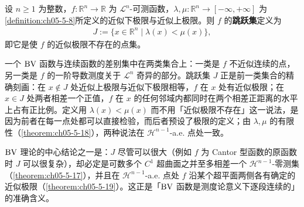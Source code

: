 \documentclass[../../main.tex]{subfiles}%
\begin{document}
\begin{definition}[跳跃集]\label{definition:ch05-5-9}
设 $n\geqslant1$ 为整数，$f:\mathbb{R}^n\to\mathbb{R}$ 为 $\mathcal{L}^n$-可测函数，$\lambda,\mu:\mathbb{R}^n\to[-\infty,+\infty]$ 为\cref{definition:ch05-5-8}所定义的近似下极限与近似上极限。则 $f$ 的\textbf{跳跃集}定义为 %
\begin{align*}
J:=\{x\in\mathbb{R}^n\mid\lambda(x)<\mu(x)\},
\end{align*}
即它是使 $f$ 的近似极限不存在的点集。
\end{definition}

\begin{remark}\label{remark:ch05-def-5-9-跳跃动机}
一个 $\mathrm{BV}$ 函数与连续函数的差别集中在两类集合上：一类是 $f$ 不近似连续的点，另一类是 $f$ 的一阶导数测度关于 $\mathcal{L}^n$ 奇异的部分。跳跃集 $J$ 正是前一类集合的精确刻画：在 $x\notin J$ 处近似上极限与近似下极限相等，$f$ 在 $x$ 处有近似极限；在 $x\in J$ 处两者相差一个正值，$f$ 在 $x$ 的任何邻域内都同时在两个相差正距离的水平上占有正比例。定义用 $\lambda(x)<\mu(x)$ 而不用「近似极限不存在」这一说法，是因为前者在每一点处都可以直接检验，而后者预设了极限的定义；由 $\lambda,\mu$ 的有限性（\cref{theorem:ch05-5-18}），两种说法在 $\mathcal{H}^{n-1}$-a.e. 点处一致。%

$\mathrm{BV}$ 理论的中心结论之一是：$J$ 尽管可以很大（例如 $f$ 为 Cantor 型函数的原函数时 $J$ 可以很复杂），却必定是可数多个 $C^1$ 超曲面之并至多相差一个 $\mathcal{H}^{n-1}$-零测集（\cref{theorem:ch05-5-17}），并且在 $\mathcal{H}^{n-1}$-a.e. 点处 $f$ 沿某个超平面两侧各有确定的近似极限（\cref{theorem:ch05-5-19}）。这正是「$\mathrm{BV}$ 函数是测度论意义下逐段连续的」的准确含义。%
\end{remark}
\end{document}
